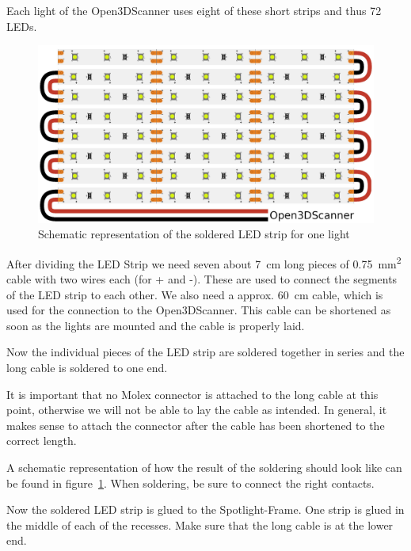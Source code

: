 Each light of the Open3DScanner uses eight of these short strips and thus 72 LEDs.%

\begin{figure}[ht!]%
	\begin{centered}%
		\includegraphics[width=\linewidth]{images/LedStripAssembly.jpg}%
		\caption{Schematic representation of the soldered LED strip for one light}%
		\label{fig:ledStripAssembly}%
	\end{centered}%
\end{figure}%

After dividing the LED Strip we need seven about \SI{7}{\centi\meter} long pieces of \SI{0.75}{\milli\meter\squared} cable with two wires each (for + and -). These are used to connect the segments of the LED strip to each other. We also need a approx. \SI{60}{\centi\meter} cable, which is used for the connection to the Open3DScanner. This cable can be shortened as soon as the lights are mounted and the cable is properly laid.%

Now the individual pieces of the LED strip are soldered together in series and the long cable is soldered to one end.%

It is important that no Molex connector is attached to the long cable at this point, otherwise we will not be able to lay the cable as intended. In general, it makes sense to attach the connector after the cable has been shortened to the correct length.%

A schematic representation of how the result of the soldering should look like can be found in figure~\ref{fig:ledStripAssembly}. When soldering, be sure to connect the right contacts.%

Now the soldered LED strip is glued to the Spotlight-Frame. One strip is glued in the middle of each of the recesses. Make sure that the long cable is at the lower end.%

